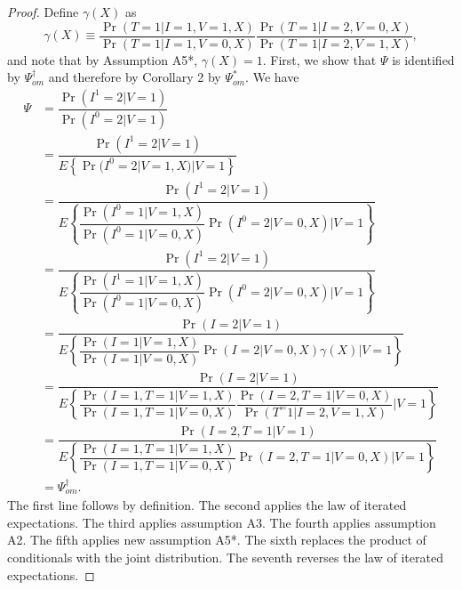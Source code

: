 \begin{appendix}
    \begin{proof}
        Define $\gamma(X)$ as 
        \begin{equation*}
            \gamma(X) \equiv \dfrac{\Pr(T = 1 | I = 1, V = 1, X)}{\Pr(T = 1 | I = 1, V = 0, X)} \dfrac{\Pr(T = 1 | I = 2, V = 0, X)}{\Pr(T = 1 | I = 2, V = 1, X)},
        \end{equation*}
        and note that by Assumption A5*, $\gamma(X) = 1$. First, we show that $\Psi$ is identified by $\Psi^\dagger_{om}$ and therefore by Corollary 2 by $\Psi^*_{om}$. We have
        \begin{align*}
            \Psi &= \dfrac{\Pr(I^1=2|V=1)}{\Pr(I^0=2|V=1)} \\
            &= \dfrac{\Pr(I^1=2|V=1)}{E\left\{\Pr(I^0=2|V=1, X) | V= 1 \right\}} \\
            &= \dfrac{\Pr(I^1=2|V=1)}{E\left\{\dfrac{\Pr(I^0=1|V=1, X)}{\Pr(I^0=1|V=0, X)}\Pr(I^0=2|V=0, X) \bigg| V= 1 \right\}} \\
            &= \dfrac{\Pr(I^1=2|V=1)}{E\left\{\dfrac{\Pr(I^1=1|V=1, X)}{\Pr(I^0=1|V=0, X)}\Pr(I^0=2|V=0, X) \bigg| V= 1 \right\}} \\
            &= \dfrac{\Pr(I=2|V=1)}{E\left\{\dfrac{\Pr(I=1|V=1, X)}{\Pr(I=1|V=0, X)}\Pr(I=2|V=0, X) \gamma(X) \bigg| V= 1 \right\}} \\
            &= \dfrac{\Pr(I=2|V=1)}{E\left\{\dfrac{\Pr(I=1, T=1|V=1, X)}{\Pr(I=1, T = 1|V=0, X)} \dfrac{\Pr(I=2, T=1|V=0, X)}{\Pr(T^ = 1 | I = 2, V = 1, X)}\bigg| V= 1 \right\}} \\
            &= \dfrac{\Pr(I=2, T=1 |V=1)}{E\left\{\dfrac{\Pr(I=1, T=1|V=1, X)}{\Pr(I=1, T= 1|V=0, X)} \Pr(I=2, T=1|V=0, X) \bigg| V= 1 \right\}} \\
            &= \Psi^\dagger_{om}.
        \end{align*}
        The first line follows by definition. The second applies the law of iterated expectations. The third applies assumption A3. The fourth applies assumption A2. The fifth applies new assumption A5*. The sixth replaces the product of conditionals with the joint distribution. The seventh reverses the law of iterated expectations. 


\end{proof}
\end{appendix}
